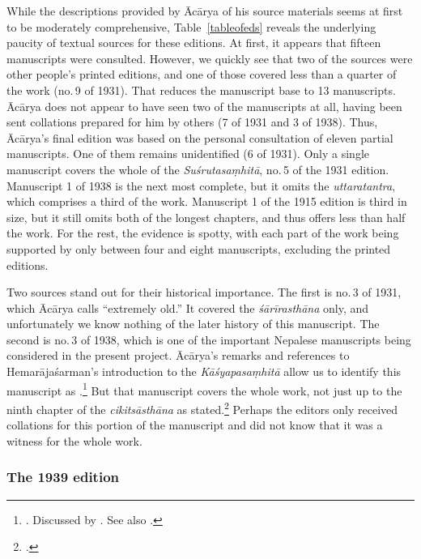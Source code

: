 While the descriptions provided by Ācārya of his source materials seems at first
to be moderately comprehensive, Table~\ref{tableofeds} reveals the underlying
paucity of textual sources for these editions.  At first, it appears that fifteen
manuscripts were consulted.  However, we quickly see that two of the sources 
were
other people's printed editions, and one of those covered less than a quarter of
the work (no.\,9 of 1931).  That reduces the manuscript base to 13 manuscripts.
Ācārya does not appear to have seen two of the manuscripts at all, having been
sent collations prepared for him by others (7 of 1931 and 3 of 1938).  Thus,
Ācārya's final edition was based on the personal consultation of eleven partial
manuscripts.   One of them remains unidentified (6 of 1931). Only a single
manuscript covers the whole of the \emph{Suśrutasaṃhitā}, no.\,5 of the 1931
edition.  Manuscript 1 of 1938 is the next most complete, but it omits the
\emph{uttaratantra}, which comprises a third of the work.  Manuscript 1 of the
1915 edition is third in size, but it still omits both of the longest chapters,
and thus offers less than half the work.  For the rest, the evidence is spotty,
with each part of the work being supported by only between four and eight
manuscripts, excluding the printed editions.

Two sources stand out for their historical importance.  The first is no.\,3 of
1931, which Ācārya calls “extremely old.”  It covered the \emph{śārīrasthāna}
only, and unfortunately we know nothing of the later history of this manuscript.
The second is no.\,3 of 1938, which is one of the important Nepalese manuscripts
being considered in the present project. Ācārya's remarks and references to
Hemarājaśarman's introduction to the \emph{Kāśyapasaṃhitā} allow us
to identify this manuscript as .\footnote{\cites[22]{vulgate}[56--57]{hema-1938}. Discussed by
\citet[\S 1.1, 2.3]{kleb-2021b}.  See also \cites[IIB, 
25--41]{meul-hist}[161--169]{wuja-2003}.} But 
that manuscript covers the whole work, not
just up to the ninth chapter of the \emph{cikitsāsthāna} as
\citeauthor{vulgate} stated.\footcite[22]{vulgate}  Perhaps the editors
only received collations for this portion of the manuscript and did not know that it
was a witness for the whole work.

\subsubsection{The 1939 edition}        


